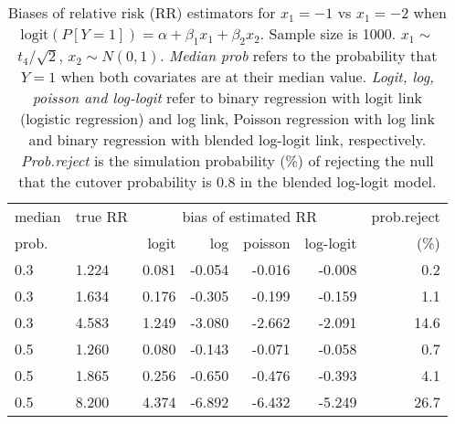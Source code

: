 \documentclass[12pt,a4paper]{article}
\begin{document}
\begin{table}[H] 
\small\sf\centering 
\caption{Biases of relative risk (RR) estimators for $x_1=-1$ vs $x_1=-2$ when $\mbox{logit}(P[Y=1])=\alpha+\beta_1 x_1 + \beta_2 x_2$. Sample size is 1000. $x_1 \sim $$t_4/\sqrt{2}$, $x_2 \sim N(0,1)$. {\it Median prob} refers to the probability that $Y=1$ when both covariates are at their median value. {\it Logit, log, poisson and log-logit} refer to binary regression with logit link (logistic regression) and log link, Poisson regression with log link and binary regression with blended log-logit link, respectively. {\it Prob.reject} is the simulation probability (\%) of rejecting the null that the cutover probability is $0.8$ in the blended log-logit model.} 
\begin{tabular}{llrrrrr} 
\toprule 
median & true RR & \multicolumn{4}{c}{bias of estimated RR} & prob.reject \\ 
prob. & & logit & log & poisson & log-logit  & (\%) \\ \midrule 
0.3 & 1.224 & 0.081 & -0.054 & -0.016 & -0.008 &  0.2 \\  
0.3 & 1.634 & 0.176 & -0.305 & -0.199 & -0.159 &  1.1 \\  
0.3 & 4.583 & 1.249 & -3.080 & -2.662 & -2.091 & 14.6 \\  
0.5 & 1.260 & 0.080 & -0.143 & -0.071 & -0.058 &  0.7 \\  
0.5 & 1.865 & 0.256 & -0.650 & -0.476 & -0.393 &  4.1 \\  
0.5 & 8.200 & 4.374 & -6.892 & -6.432 & -5.249 & 26.7 \\  
\bottomrule 
\end{tabular} 
\end{table} 
\end{document}

